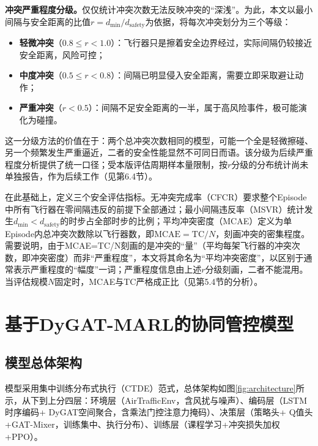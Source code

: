 \documentclass[12pt,a4paper,UTF8]{ctexart}
\begin{document}
\textbf{冲突严重程度分级。}仅仅统计冲突次数无法反映冲突的“深浅”。为此，本文以最小间隔与安全距离的比值$r=d_{\min}/d_{\text{safety}}$为依据，将每次冲突划分为三个等级：
\begin{itemize}
    \item \textbf{轻微冲突}（$0.8\leq r<1.0$）：飞行器只是擦着安全边界经过，实际间隔仍较接近安全距离，风险可控；
    \item \textbf{中度冲突}（$0.5\leq r<0.8$）：间隔已明显侵入安全距离，需要立即采取避让动作；
    \item \textbf{严重冲突}（$r<0.5$）：间隔不足安全距离的一半，属于高风险事件，极可能演化为碰撞。
\end{itemize}

这一分级方法的价值在于：两个总冲突次数相同的模型，可能一个全是轻微擦碰、另一个频繁发生严重逼近，二者的安全性能显然不可同日而语。该分级为后续严重程度分析提供了统一口径；受本版评估周期样本量限制，按$r$分级的分布统计尚未单独报告，作为后续工作（见第6.4节）。

在此基础上，定义三个安全评估指标。无冲突完成率（CFCR）要求整个Episode中所有飞行器在零间隔违反的前提下全部通过；最小间隔违反率（MSVR）统计发生$d_{\min}<d_{\text{safety}}$的时步占全部时步的比例；平均冲突密度（MCAE）定义为单Episode内总冲突次数除以飞行器数，即$\mathrm{MCAE}=\mathrm{TC}/N$，刻画冲突的密集程度。需要说明，由于MCAE=TC/N刻画的是冲突的“量”（平均每架飞行器的冲突次数，即冲突密度）而非“严重程度”，本文将其命名为“平均冲突密度”，以区别于通常表示严重程度的“幅度”一词；严重程度信息由上述$r$分级刻画，二者不能混用。当评估规模$N$固定时，MCAE与TC严格成正比（见第5.4节的分析）。

\section{基于DyGAT-MARL的协同管控模型}

\subsection{模型总体架构}

模型采用集中训练分布式执行（CTDE）范式，总体架构如图\ref{fig:architecture}所示，从下到上分四层：环境层（AirTrafficEnv，含风扰与噪声）、编码层（LSTM时序编码+ DyGAT空间聚合，含乘法门控注意力掩码）、决策层（策略头+ Q值头+GAT-Mixer，训练集中、执行分布）、训练层（课程学习+冲突损失加权+PPO）。
\end{document}
